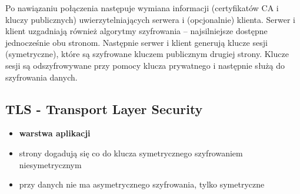 \documentclass[../main.tex]{subfiles}
\begin{document}
    Po nawiązaniu połączenia następuje wymiana informacji (certyfikatów CA i kluczy publicznych)
    uwierzytelniających serwera i (opcjonalnie) klienta.
    Serwer i klient uzgadniają również algorytmy szyfrowania – najsilniejsze dostępne jednocześnie obu stronom.
    Następnie serwer i klient generują klucze sesji (symetryczne), które są szyfrowane kluczem
    publicznym drugiej strony. Klucze sesji są odszyfrowywane przy pomocy klucza prywatnego i
    następnie służą do szyfrowania danych.

    \subsection{TLS - Transport Layer Security}
    \begin{itemize}
        \item \textbf{warstwa aplikacji}
        \item strony dogadują się co do klucza symetrycznego szyfrowaniem niesymetrycznym
        \item przy danych nie ma asymetrycznego szyfrowania, tylko symetryczne
    \end{itemize}
\end{document}
